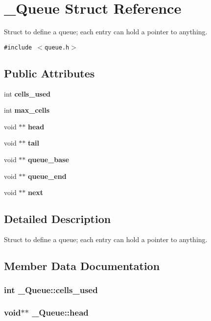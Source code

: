 \section{\_\-Queue Struct Reference}
\label{struct__Queue}
Struct to define a queue; each entry can hold a pointer to anything.  


{\tt \#include $<$queue.h$>$}

\subsection*{Public Attributes}
\begin{CompactItemize}
\item 
int \bf{cells\_\-used}
\item 
int \bf{max\_\-cells}
\item 
void $\ast$$\ast$ \bf{head}
\item 
void $\ast$$\ast$ \bf{tail}
\item 
void $\ast$$\ast$ \bf{queue\_\-base}
\item 
void $\ast$$\ast$ \bf{queue\_\-end}
\item 
void $\ast$$\ast$ \bf{next}
\end{CompactItemize}


\subsection{Detailed Description}
Struct to define a queue; each entry can hold a pointer to anything. 



\subsection{Member Data Documentation}
\subsubsection{\setlength{\rightskip}{0pt plus 5cm}int \bf{\_\-Queue::cells\_\-used}}\label{struct__Queue_69b6f2aa06ff3fe2b58edda9ba5d5320}


\subsubsection{\setlength{\rightskip}{0pt plus 5cm}void$\ast$$\ast$ \bf{\_\-Queue::head}}\label{struct__Queue_b8b3de4166a67eed8e78f2525c3c703b}


